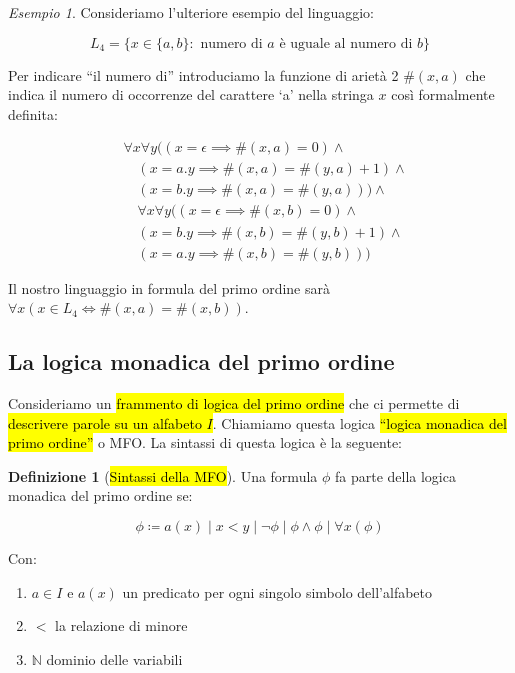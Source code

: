 \documentclass[a4paper,11pt,oneside]{article}
\theoremstyle{plain}
\theoremstyle{definition}
\newtheorem{defn}{Definizione}[section]
\theoremstyle{remark}
\newtheorem{esempio}{Esempio}[section]
\begin{document}
\begin{esempio}
  Consideriamo l'ulteriore esempio del linguaggio:

  \[
    L_4 = \{x \in \{a,b\} : \text{ numero di } a \text{ è uguale al numero di } b\}
  \]

  Per indicare ``il numero di'' introduciamo la funzione di arietà 2 $\#(x,a)$ che
  indica il numero di occorrenze del carattere `a' nella stringa $x$ così
  formalmente definita:

  \begin{align*}
    & \forall x \forall y ((x = \epsilon \implies \#(x,a)=0) \land \\
      & \quad (x = a.y \implies \#(x,a) = \#(y,a)+1) \land \\
      & \quad (x=b.y \implies \#(x,a) = \#(y,a))) \land \\
      & \quad \forall x \forall y ((x = \epsilon \implies \#(x,b)=0) \land \\
      & \quad (x = b.y \implies \#(x,b) = \#(y,b)+1) \land \\
      & \quad (x=a.y \implies \#(x,b) = \#(y,b)))
  \end{align*}

  Il nostro linguaggio in formula del primo ordine sarà
  $\forall x (x \in L_4 \iff \#(x,a)=\#(x,b))$.
\end{esempio}

\subsection{La logica monadica del primo ordine}\label{sec:mfo}

Consideriamo un \hl{frammento di logica del primo ordine} che ci permette di
\hl{descrivere parole su un alfabeto $I$}. Chiamiamo questa logica \hl{``logica
monadica del primo ordine''} o MFO\@. La sintassi di questa logica è la
seguente:

\begin{defn}[\hl{Sintassi della MFO}]\label{def:mfo-sintassi}
  Una formula $\phi$ fa parte della logica monadica del primo ordine se:

  \[
    \phi\coloneqq a(x) \mid x < y \mid\neg\phi\mid\phi\land\phi\mid\forall x(\phi)
  \]

  Con:
  \begin{enumerate}
    \item $a \in I$ e $a(x)$ un predicato per ogni singolo simbolo dell'alfabeto
    \item $<$ la relazione di minore
    \item $\mathbb{N}$ dominio delle variabili
  \end{enumerate}
\end{defn}
\end{document}
